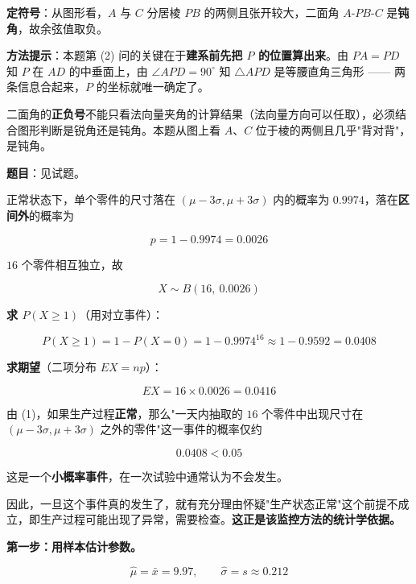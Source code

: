 \textbf{定符号}：从图形看，$A$ 与 $C$ 分居棱 $PB$ 的两侧且张开较大，二面角 $A\text{-}PB\text{-}C$ 是\textbf{钝角}，故余弦值取负。


\begin{gktip}
\textbf{方法提示}：本题第 (2) 问的关键在于\textbf{建系前先把 $P$ 的位置算出来}。由 $PA=PD$ 知 $P$ 在 $AD$ 的中垂面上，由 $\angle APD=90^\circ$ 知 $\triangle APD$ 是等腰直角三角形 —— 两条信息合起来，$P$ 的坐标就唯一确定了。

二面角的\textbf{正负号}不能只看法向量夹角的计算结果（法向量方向可以任取），必须结合图形判断是锐角还是钝角。本题从图上看 $A$、$C$ 位于棱的两侧且几乎"背对背"，是钝角。
\end{gktip}

\par\medskip


\textbf{题目}：见试题。


正常状态下，单个零件的尺寸落在 $(\mu-3\sigma,\mu+3\sigma)$ 内的概率为 $0.9974$，落在\textbf{区间外}的概率为

\[p=1-0.9974=0.0026\]

$16$ 个零件相互独立，故

\[X\sim B(16,\ 0.0026)\]

\textbf{求 $P(X\ge1)$}（用对立事件）：

\[P(X\ge1)=1-P(X=0)=1-0.9974^{16}\approx1-0.9592=0.0408\]

\textbf{求期望}（二项分布 $EX=np$）：

\[EX=16\times0.0026=0.0416\]


由 (1)，如果生产过程\textbf{正常}，那么"一天内抽取的 $16$ 个零件中出现尺寸在 $(\mu-3\sigma,\mu+3\sigma)$ 之外的零件"这一事件的概率仅约

\[0.0408<0.05\]

这是一个\textbf{小概率事件}，在一次试验中通常认为不会发生。

因此，一旦这个事件真的发生了，就有充分理由怀疑"生产状态正常"这个前提不成立，即生产过程可能出现了异常，需要检查。\textbf{这正是该监控方法的统计学依据。}


\textbf{第一步：用样本估计参数。}

\[\hat\mu=\bar x=9.97,\qquad \hat\sigma=s\approx0.212\]

